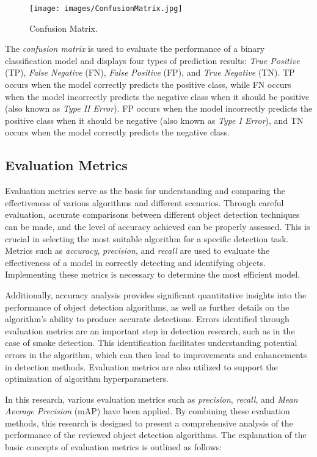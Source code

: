 \begin{figure}[H]
  \centering
  \texttt{[image: images/ConfusionMatrix.jpg]}
  \caption{Confusion Matrix.}
  \label{fig:confusion}
\end{figure}

The \emph{confusion matrix} is used to evaluate the performance of a binary classification model and displays four types of prediction results: \emph{True Positive} (TP), \emph{False Negative} (FN), \emph{False Positive} (FP), and \emph{True Negative} (TN). TP occurs when the model correctly predicts the positive class, while FN occurs when the model incorrectly predicts the negative class when it should be positive (also known as \emph{Type II Error}). FP occurs when the model incorrectly predicts the positive class when it should be negative (also known as \emph{Type I Error}), and TN occurs when the model correctly predicts the negative class.

\subsection{Evaluation Metrics}
\label{subsec:Evaluation Metrics}

Evaluation metrics serve as the basis for understanding and comparing the effectiveness of various algorithms and different scenarios. Through careful evaluation, accurate comparisons between different object detection techniques can be made, and the level of accuracy achieved can be properly assessed. This is crucial in selecting the most suitable algorithm for a specific detection task. Metrics such as \emph{accuracy}, \emph{precision}, and \emph{recall} are used to evaluate the effectiveness of a model in correctly detecting and identifying objects. Implementing these metrics is necessary to determine the most efficient model.

Additionally, accuracy analysis provides significant quantitative insights into the performance of object detection algorithms, as well as further details on the algorithm's ability to produce accurate detections. Errors identified through evaluation metrics are an important step in detection research, such as in the case of smoke detection. This identification facilitates understanding potential errors in the algorithm, which can then lead to improvements and enhancements in detection methods. Evaluation metrics are also utilized to support the optimization of algorithm hyperparameters.

In this research, various evaluation metrics such as \emph{precision}, \emph{recall}, and \emph{Mean Average Precision} (mAP) have been applied. By combining these evaluation methods, this research is designed to present a comprehensive analysis of the performance of the reviewed object detection algorithms. The explanation of the basic concepts of evaluation metrics is outlined as follows:

